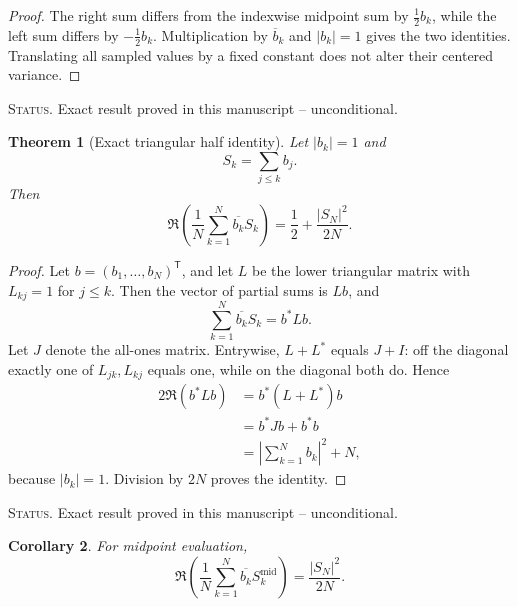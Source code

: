 \documentclass[11pt]{amsart}
\numberwithin{equation}{section}
\theoremstyle{plain}
\newtheorem{theorem}{Theorem}[section]
\newtheorem{corollary}[theorem]{Corollary}
\theoremstyle{definition}
\theoremstyle{remark}
\newcommand{\1}{\mathbf{1}}
\newcommand{\statusnote}[1]{%
  \par\smallskip\noindent
  \begingroup\footnotesize\textsc{Status.} #1\endgroup
  \par\smallskip}
\begin{document}
\begin{proof}
The right sum differs from the indexwise midpoint sum by
\(\frac12b_k\), while the left sum differs by \(-\frac12b_k\).
Multiplication by \(\overline b_k\) and \(|b_k|=1\) gives the two
identities.  Translating all sampled values by a fixed constant does not
alter their centered variance.
\end{proof}

\statusnote{Exact result proved in this manuscript -- unconditional.}
\begin{theorem}[Exact triangular half identity]
\label{thm:triangular_half}
Let \(|b_k|=1\) and
\begin{equation}
S_k=\sum_{j\leq k}b_j.
\label{eq:triangular_partial_sums}
\end{equation}
Then
\begin{equation}
\boxed{
\Re\left(
\frac1N\sum_{k=1}^N\overline{b_k}S_k
\right)
=
\frac12+\frac{|S_N|^2}{2N}.
}
\label{eq:triangular_half_identity}
\end{equation}
\end{theorem}

\begin{proof}
Let \(b=(b_1,\ldots,b_N)^{\mathsf T}\), and let \(L\) be the lower
triangular matrix with \(L_{kj}=1\) for \(j\leq k\).  Then the vector of
partial sums is \(Lb\), and
\begin{equation}
\sum_{k=1}^{N}\overline{b_k}S_k
=
b^\ast Lb.
\label{eq:triangular_form_detailed}
\end{equation}
Let \(J\) denote the all-ones matrix.  Entrywise, \(L+L^\ast\) equals
\(J+I\): off the diagonal exactly one of \(L_{jk},L_{kj}\) equals one,
while on the diagonal both do.  Hence
\begin{align}
2\Re(b^\ast Lb)
&=
b^\ast(L+L^\ast)b
\label{eq:triangular_real_part_one}
\\
&=
b^\ast Jb+b^\ast b
\label{eq:triangular_real_part_two}
\\
&=
\left|\sum_{k=1}^{N}b_k\right|^2+N,
\label{eq:triangular_real_part_three}
\end{align}
because \(|b_k|=1\).  Division by \(2N\) proves the identity.
\end{proof}

\statusnote{Exact result proved in this manuscript -- unconditional.}
\begin{corollary}
\label{cor:midpoint_triangular}
For midpoint evaluation,
\begin{equation}
\Re\left(
\frac1N\sum_{k=1}^N
\overline{b_k}S_k^{\mathrm{mid}}
\right)
=
\frac{|S_N|^2}{2N}.
\label{eq:midpoint_triangular}
\end{equation}
\end{corollary}
\end{document}
